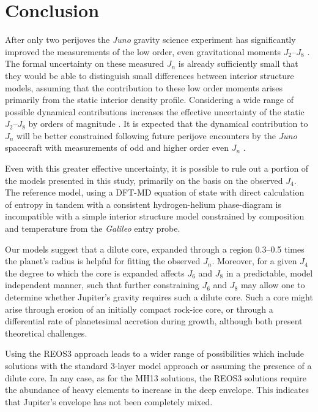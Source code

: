 \section{Conclusion} \label{sec:conclusion}

After only two perijoves the \textit{Juno} gravity science experiment has
significantly improved the measurements of the low order, even gravitational
moments $J_2$--$J_8$ \citep{Folkner2017}. The formal uncertainty on these
measured $J_n$ is already sufficiently small that they would be able to
distinguish small differences between interior structure models, assuming that
the contribution to these low order moments arises primarily from the static
interior density profile. Considering a wide range of possible dynamical
contributions increases the effective uncertainty of the static $J_2$--$J_8$ by
orders of magnitude \citep{Kaspi2017}. It is expected that the dynamical
contribution to $J_n$ will be better constrained following future perijove
encounters by the \textit{Juno} spacecraft with measurements of odd and higher
order even $J_n$ \citep{Kaspi2013}. 

Even with this greater effective uncertainty, it is possible to rule out
a portion of the models presented in this study, primarily on the basis on the
observed $J_4$. The reference model, using a DFT-MD equation of state with
direct calculation of entropy in tandem with a consistent hydrogen-helium
phase-diagram is incompatible with a simple interior structure  model
constrained by composition and temperature from the \textit{Galileo} entry
probe. 

Our models suggest that a dilute core, expanded through a region 0.3--0.5
times the planet's radius is helpful for fitting the observed $J_n$.  Moreover,
for a given $J_4$ the degree to which the core is expanded affects $J_6$ and
$J_8$ in a predictable, model independent manner, such that further
constraining $J_6$ and $J_8$ may allow one to determine whether Jupiter's
gravity requires such a dilute core. Such a core might arise through erosion
of an initially compact rock-ice core, or through a differential rate of
planetesimal accretion during growth, although both present theoretical
challenges.

Using the REOS3 approach leads to a wider range of possibilities which include
solutions with the standard 3-layer model approach or assuming the presence of
a dilute core.  In any case, as for the MH13 solutions, the REOS3 solutions
require the abundance of heavy elements to increase in the deep envelope. This
indicates that Jupiter's envelope has not been completely mixed. 

